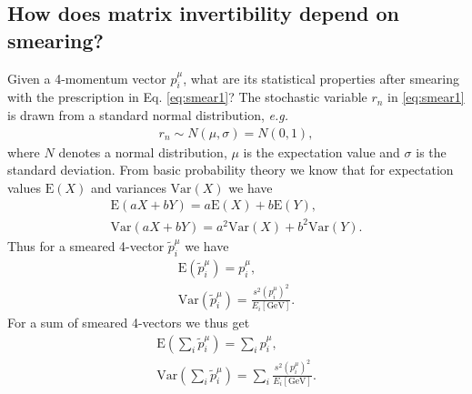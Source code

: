 \documentclass[twoside,english]{uiofysmaster}
\begin{document}


\subsection{How does matrix invertibility depend on smearing?}
Given a 4-momentum vector $p^\mu_i$, what are its statistical properties after smearing with the prescription in Eq. \eqref{eq:smear1}? The stochastic variable $r_n$ in \eqref{eq:smear1} is drawn from a standard normal distribution, {\it e.g.}\
\begin{align}
	r_n \sim N(\mu,\sigma) = N(0,1),
\end{align}
where $N$ denotes a normal distribution, $\mu$ is the expectation value and $\sigma$ is the standard deviation. From basic probability theory we know that for expectation values $\mathrm E(X)$ and variances $\mathrm{Var}(X)$ we have
\begin{align}
	\mathrm E(aX+bY) = a\mathrm E(X) + b\mathrm E(Y),\\
	\mathrm{Var}(aX + bY) = a^2\mathrm{Var}(X) + b^2\mathrm{Var}(Y).\nonumber
\end{align}
Thus for a smeared 4-vector $\tilde{p}^\mu_i$ we have
\begin{align}
	\mathrm E(\tilde{p}^\mu_i) = p^\mu_i,\\
	\mathrm{Var}(\tilde{p}^\mu_i) = \frac{s^2 (p^\mu_i)^2}{E_i\mathrm{[GeV]}}.
\end{align}
For a sum of smeared 4-vectors we thus get
\begin{align}
		\mathrm E\left(\sum_i \tilde{p}^\mu_i\right) = \sum_i p^\mu_i,\\
	\mathrm{Var}\left(\sum_i \tilde{p}^\mu_i\right) = \sum_i \frac{s^2 (p^\mu_i)^2}{E_i\mathrm{[GeV]}}.
\end{align}
\end{document}
